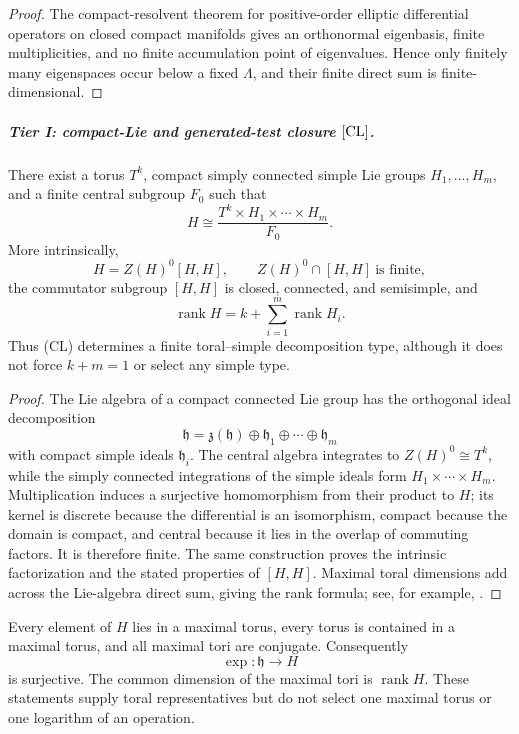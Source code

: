 \documentclass[11pt,a4paper]{article}
\begin{document}
\begin{proof}
The compact-resolvent theorem for positive-order elliptic differential
operators on closed compact manifolds \cite{gilkey1995invariance} gives
an orthonormal eigenbasis, finite multiplicities, and no finite accumulation
point of eigenvalues.  Hence only finitely many eigenspaces occur below a fixed
\(\Lambda\), and their finite direct sum is finite-dimensional.
\end{proof}

\subparagraph{Tier I: compact-Lie and generated-test closure \([{\rm CL}]\).}

\begin{theorem}
\label{p2:thm:compact-connected-global-structure}
There exist a torus \(T^k\), compact simply connected simple Lie groups
\(H_1,\ldots,H_m\), and a finite central subgroup \(F_0\) such that
\[
 H\cong
 \frac{T^k\times H_1\times\cdots\times H_m}{F_0}.
\]
More intrinsically,
\[
 H=Z(H)^0[H,H],
 \qquad
 Z(H)^0\cap[H,H]\ \text{is finite},
\]
the commutator subgroup \([H,H]\) is closed, connected, and semisimple, and
\[
 \operatorname{rank}H
 =k+\sum_{i=1}^m\operatorname{rank}H_i.
\]
Thus (CL) determines a finite toral--simple decomposition type, although it
does not force \(k+m=1\) or select any simple type.
\end{theorem}

\begin{proof}
The Lie algebra of a compact connected Lie group has the orthogonal ideal
decomposition
\[
 \mathfrak h=\mathfrak z(\mathfrak h)
 \oplus\mathfrak h_1\oplus\cdots\oplus\mathfrak h_m
\]
with compact simple ideals \(\mathfrak h_i\).  The central algebra integrates
to \(Z(H)^0\cong T^k\), while the simply connected integrations of the simple
ideals form \(H_1\times\cdots\times H_m\).  Multiplication induces a
surjective homomorphism from their product to \(H\); its kernel is discrete
because the differential is an isomorphism, compact because the domain is
compact, and central because it lies in the overlap of commuting factors.
It is therefore finite.  The same construction proves the intrinsic
factorization and the stated properties of \([H,H]\).  Maximal toral
dimensions add across the Lie-algebra direct sum, giving the rank formula;
see, for example, \cite{chevalley1946theory,Hall2015lie}.
\end{proof}

\begin{theorem}
\label{p2:thm:maximal-torus-exponential}
Every element of \(H\) lies in a maximal torus, every torus is contained in a
maximal torus, and all maximal tori are conjugate.  Consequently
\[
 \exp:\mathfrak h\longrightarrow H
\]
is surjective.  The common dimension of the maximal tori is
\(\operatorname{rank}H\).  These statements supply toral representatives but
do not select one maximal torus or one logarithm of an operation.
\end{theorem}
\end{document}
